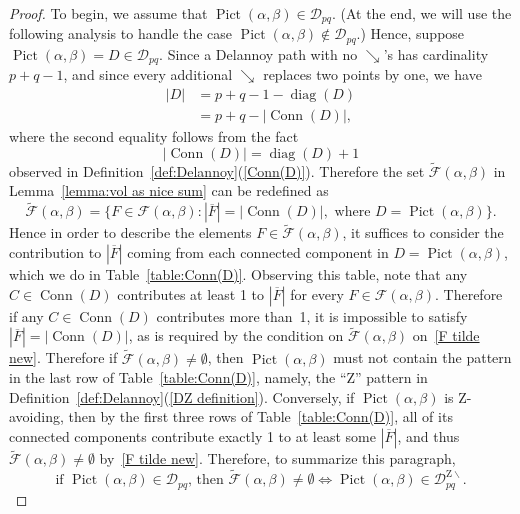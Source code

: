 \documentclass[noamsfonts,10pt]{amsart}
\newcommand{\D}{\mathcal{D}}
\newcommand{\DZ}{\mathcal{D}^{\mathrm{Z} \!\!\!\! \backslash}}
\newcommand{\al}{\alpha}
\newcommand{\be}{\beta}
\DeclareMathOperator{\Pic}{Pict}
\newcommand{\F}{\mathcal{F}}
\newcommand{\dd}{\operatorname{diag}}
\DeclareMathOperator{\Conn}{Conn}
\newcommand{\1}{\mathbf{1}}
\theoremstyle{plain}
\theoremstyle{definition}
\numberwithin{equation}{section}
\begin{document}
\begin{proof}
    To begin, we assume that $\Pic(\al,\be) \in \D_{pq}$.
    (At the end, we will use the following analysis to handle the case $\Pic(\al,\be) \notin \D_{pq}$.)
    Hence, suppose $\Pic(\al,\be) = D \in \D_{pq}$.
    Since a Delannoy path with no $\searrow$'s has cardinality $p+q-1$, and since every additional $\searrow$ replaces two points by one, we have
    \begin{align}
        |D| &= p + q - 1 - \dd(D) \nonumber \\
        &= p + q - \left| \Conn(D) \right|, \label{D = p+q-Conn}
    \end{align}
    where the second equality follows from the fact 
    \begin{equation}
        \label{Conn = diag + 1}
        \left| \Conn(D) \right| = \dd(D) + 1
    \end{equation}
    observed in Definition~\ref{def:Delannoy}(\ref{Conn(D)}).
    Therefore the set $\widetilde{\F}(\al,\be)$ in Lemma~\ref{lemma:vol as nice sum} can be redefined as
    \begin{equation}
        \label{F tilde new}
        \widetilde{\F}(\al,\be) = \Big\{ F \in \F(\al,\be) : |\overline{F}| = \left| \Conn(D) \right|, \text{ where } D = \Pic(\al,\be) \Big\}.
    \end{equation}
    Hence in order to describe the elements $F \in \widetilde{\F}(\al,\be)$, it suffices to consider the contribution to $|\overline{F}|$ coming from each connected component in $D = \Pic(\al,\be)$, which we do in Table~\ref{table:Conn(D)}.
    Observing this table, note that any $C \in \Conn(D)$ contributes at least 1 to $|\overline{F}|$ for every $F \in \F(\al,\be)$.
    Therefore if any $C \in \Conn(D)$ contributes more than~1, it is impossible to satisfy $|\overline{F}| = \left| \Conn(D) \right|$, as is required by the condition on $\widetilde{\F}(\al,\be)$ on~\eqref{F tilde new}.
    Therefore if $\widetilde{\F}(\al,\be) \neq \emptyset$, then $\Pic(\al,\be)$ must not contain the pattern in the last row of Table~\ref{table:Conn(D)}, namely, the ``Z'' pattern in Definition~\ref{def:Delannoy}(\ref{DZ definition}).
    Conversely, if $\Pic(\al,\be)$ is Z-avoiding, then by the first three rows of Table~\ref{table:Conn(D)}, all of its connected components contribute exactly 1 to at least some $|\overline{F}|$, and thus $\widetilde{\F}(\al,\be) \neq \emptyset$ by~\eqref{F tilde new}.
    Therefore, to summarize this paragraph,
    \begin{equation}
        \label{assuming D, must be DZ}
        \text{if $\Pic(\al,\be) \in \D_{pq}$, then $\widetilde{\F}(\al,\be) \neq \emptyset \Longleftrightarrow \Pic(\al,\be) \in \DZ_{pq}$}.
    \end{equation}


\end{proof}
\end{document}
